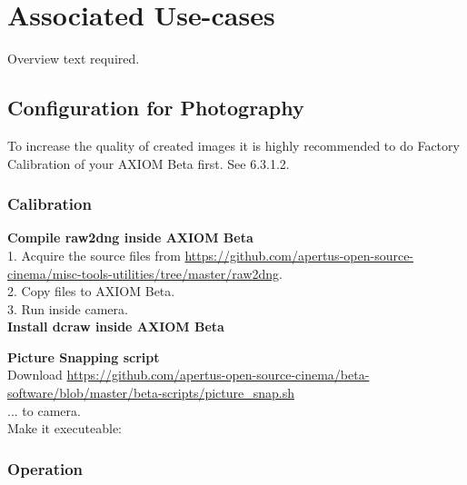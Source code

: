 \section{Associated Use-cases}

Overview text required.




\subsection{Configuration for Photography}

To increase the quality of created images it is highly recommended to do Factory Calibration of your AXIOM Beta first. See 6.3.1.2.\\




\subsubsection{Calibration}

\textbf{Compile raw2dng inside AXIOM Beta}\\

1. Acquire the source files from \href{https://github.com/apertus-open-source-cinema/misc-tools-utilities/tree/master/raw2dng}{https://github.com/apertus-open-source-cinema/misc-tools-utilities/tree/master/raw2dng}.\\
2. Copy files to AXIOM Beta.\\
3. Run  inside camera. \\

\textbf{Install dcraw inside AXIOM Beta}\\

    
\textbf{Picture Snapping script}\\

Download \href{https://github.com/apertus-open-source-cinema/beta-software/blob/master/beta-scripts/picture_snap.sh}{https://github.com/apertus-open-source-cinema/beta-software/blob/master/beta-scripts/picture_snap.sh}\\ 

... to camera.\\

Make it executeable:      




\subsubsection{Operation}


